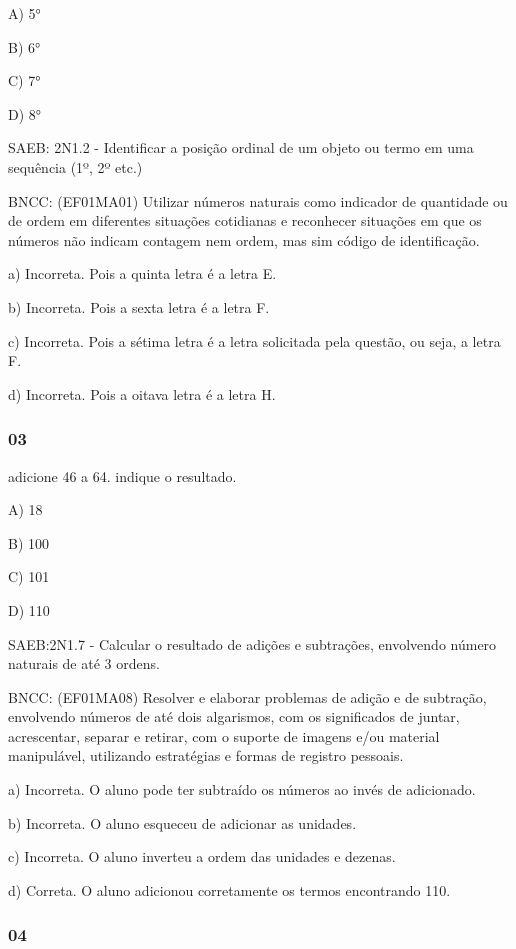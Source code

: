 A) 5°

B) 6°

C) 7°

D) 8°

SAEB: 2N1.2 - Identificar a posição ordinal de um objeto ou termo em uma
sequência (1º, 2º etc.)

BNCC: (EF01MA01) Utilizar números naturais como indicador de quantidade
ou de ordem em diferentes situações cotidianas e reconhecer situações em
que os números não indicam contagem nem ordem, mas sim código de
identificação.

a) Incorreta. Pois a quinta letra é a letra E.

b) Incorreta. Pois a sexta letra é a letra F.

c) Incorreta. Pois a sétima letra é a letra solicitada pela questão, ou
seja, a letra F.

d) Incorreta. Pois a oitava letra é a letra H.

\subsubsection{03}\label{section-89}

adicione 46 a 64. indique o resultado.

A) 18

B) 100

C) 101

D) 110

SAEB:2N1.7 - Calcular o resultado de adições e subtrações, envolvendo
número naturais de até 3 ordens.

BNCC: (EF01MA08) Resolver e elaborar problemas de adição e de subtração,
envolvendo números de até dois algarismos, com os significados de
juntar, acrescentar, separar e retirar, com o suporte de imagens e/ou
material manipulável, utilizando estratégias e formas de registro
pessoais.

a) Incorreta. O aluno pode ter subtraído os números ao invés de
adicionado.

b) Incorreta. O aluno esqueceu de adicionar as unidades.

c) Incorreta. O aluno inverteu a ordem das unidades e dezenas.

d) Correta. O aluno adicionou corretamente os termos encontrando 110.

\subsubsection{04}\label{section-90}


